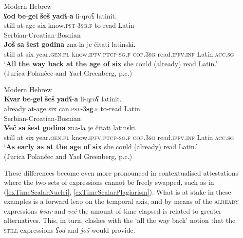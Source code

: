 \begin{exe}
		\ex\label{exTimeScalarComparisonStill}
	\begin{xlist}
		\ex Modern Hebrew\\
		\gll 
		\textbf{ʕod} \textbf{be}-\textbf{gel} \textbf{šeš} \textbf{yadʕ}-\textbf{a} li-qroʕ latinit.\\
still at-age six know.\textsc{pst}-3\textsc{sg}.\textsc{f} to-read Latin\\
		
		\ex Serbian-Croatian-Bosnian\\
		\gll \textbf{Još} \textbf{sa} \textbf{šest} \textbf{godina} zna-la je čitati latinski.\\
still at six year.\textsc{gen}.\textsc{pl} know.\textsc{ipfv}.\textsc{ptcp}-\textsc{sg}.\textsc{f} \textsc{cop}.3\textsc{sg} read.\textsc{ipfv}.\textsc{inf} Latin.\textsc{acc}.\textsc{sg}\\
	\glt \lq \textbf{All the way back at the age of six} she could (already) read Latin.\rq
	\\(Jurica Polančec and Yael Greenberg, p.c.)
	\end{xlist}
	
		\ex\label{exTimeScalarComparisonAlready}\is{already}
	\begin{xlist}
		\ex Modern Hebrew\\
		\gll \textbf{Kvar} \textbf{be}-\textbf{gel} \textbf{šeš} \textbf{yadʕ}-\textbf{a} li-qroʕ latinit.\\ 
already at-age six can.\textsc{pst}-3\textbf{sg}.\textsc{f} to-read Latin\\
		\ex Serbian-Croatian-Bosnian\\
		\gll \textbf{Več} \textbf{sa} \textbf{šest} \textbf{godina} zna-la je čitati latinski.\\
still at six year.\textsc{gen}.\textsc{pl} know.\textsc{ipfv}.\textsc{ptcp}-\textsc{sg}.\textsc{f} \textsc{cop}.3\textsc{sg} read.\textsc{ipfv}.\textsc{inf} Latin.\textsc{acc}.\textsc{sg}\\
	\glt \lq \textbf{As early as at the age of six} she could (already) read Latin.\rq
	\\(Jurica Polančec and Yael Greenberg, p.c.)
	\end{xlist}
\end{exe}

These differences become even more pronounced in contextualised attestations where the two sets of expressions cannot be freely swapped, such as in (\ref{exTimeScalarNuclei}, \ref{exTimeScalarPlagiarism}). What is at stake in these examples is a forward leap on the temporal axis, and by means of the \textsc{already} expressions \textit{kvar} and \textit{već} the amount of time elapsed is related to greater alternatives. This, in turn, clashes with the \lq all the way back\rq{ }notion that the \textsc{still} expressions \textit{ʕod} and \textit{još} would provide.  

